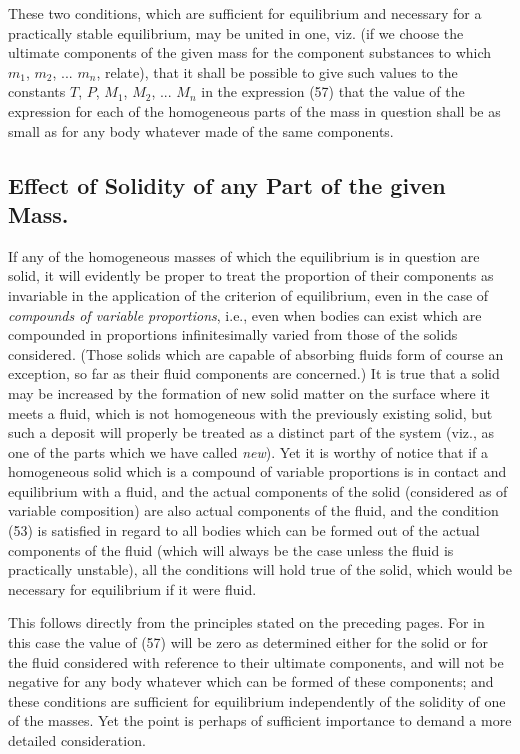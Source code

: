 \documentclass[12pt]{article}
\begin{document}
These two conditions, which are sufficient for equilibrium and necessary for a practically stable equilibrium, may be united in one, viz. (if we choose the ultimate components of the given mass for the component substances to which $m_1$, $m_2$, ... $m_n$, relate), that it shall be possible to give such values to the constants $T$, $P$, $M_1$, $M_2$, ... $M_n$ in the expression (57) that the value of the expression for each of the homogeneous parts of the mass in question shall be as small as for any body whatever made of the same components.

\subsection{Effect of Solidity of any Part of the given Mass.}
If any of the homogeneous masses of which the equilibrium is in question are solid, it will evidently be proper to treat the proportion of their components as invariable in the application of the criterion of equilibrium, even in the case of \textit{compounds of variable proportions}, i.e., even when bodies can exist which are compounded in proportions infinitesimally varied from those of the solids considered. (Those solids which are capable of absorbing fluids form of course an exception, so far as their fluid components are concerned.) It is true that a solid may be increased by the formation of new solid matter on the surface where it meets a fluid, which is not homogeneous with the previously existing solid, but such a deposit will properly be treated as a distinct part of the system (viz., as one of the parts which we have called \textit{new}). Yet it is worthy of notice that if a homogeneous solid which is a compound of variable proportions is in contact and equilibrium with a fluid, and the actual components of the solid (considered as of variable composition) are also actual components of the fluid, and the condition (53) is satisfied in regard to all bodies which can be formed out of the actual components of the fluid (which will always be the case unless the fluid is practically unstable), all the conditions will hold true of the solid, which would be necessary for equilibrium if it were fluid.


This follows directly from the principles stated on the preceding pages. For in this case the value of (57) will be zero as determined either for the solid or for the fluid considered with reference to their ultimate components, and will not be negative for any body whatever which can be formed of these components; and these conditions are sufficient for equilibrium independently of the solidity of one of the masses. Yet the point is perhaps of sufficient importance to demand a more detailed consideration.
\end{document}
